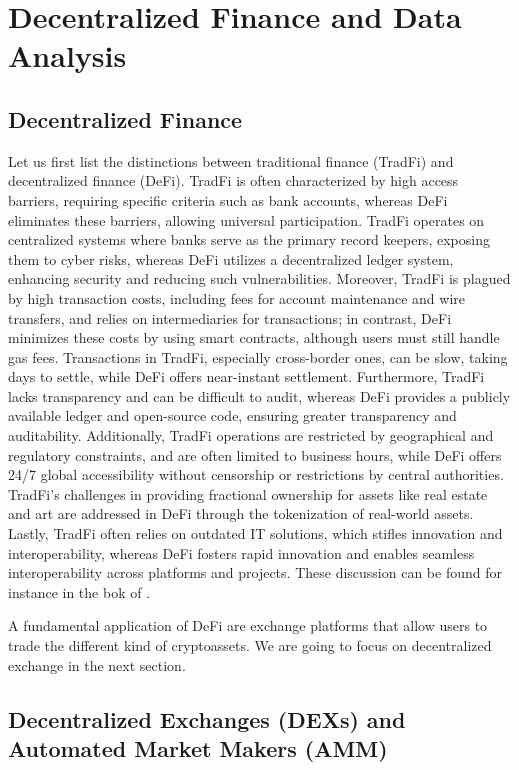 \chapter{Decentralized Finance and Data Analysis}\label{chap:defi}

\section{Decentralized Finance}

Let us first list the distinctions between traditional finance (TradFi) and decentralized finance (DeFi). TradFi is often characterized by high access barriers, requiring specific criteria such as bank accounts, whereas DeFi eliminates these barriers, allowing universal participation. TradFi operates on centralized systems where banks serve as the primary record keepers, exposing them to cyber risks, whereas DeFi utilizes a decentralized ledger system, enhancing security and reducing such vulnerabilities. Moreover, TradFi is plagued by high transaction costs, including fees for account maintenance and wire transfers, and relies on intermediaries for transactions; in contrast, DeFi minimizes these costs by using smart contracts, although users must still handle gas fees. Transactions in TradFi, especially cross-border ones, can be slow, taking days to settle, while DeFi offers near-instant settlement. Furthermore, TradFi lacks transparency and can be difficult to audit, whereas DeFi provides a publicly available ledger and open-source code, ensuring greater transparency and auditability. Additionally, TradFi operations are restricted by geographical and regulatory constraints, and are often limited to business hours, while DeFi offers 24/7 global accessibility without censorship or restrictions by central authorities. TradFi's challenges in providing fractional ownership for assets like real estate and art are addressed in DeFi through the tokenization of real-world assets. Lastly, TradFi often relies on outdated IT solutions, which stifles innovation and interoperability, whereas DeFi fosters rapid innovation and enables seamless interoperability across platforms and projects. These discussion can be found for instance in the bok of \citet{Lipton2021}.

A fundamental application of DeFi are exchange platforms that allow users to trade the different kind of cryptoassets. We are going to focus on decentralized exchange in the next section.

\section{Decentralized Exchanges (DEXs) and Automated Market Makers (AMM)}

